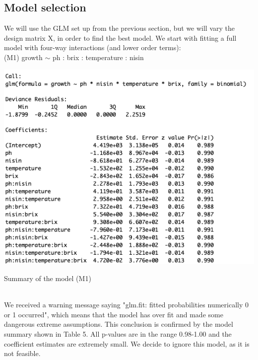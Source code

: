 \documentclass{article}
\begin{document}
\subsection{Model selection}
We will use the GLM set up from the previous section, but we will vary the design matrix X, in order to find the best model.
We start with fitting a full model with four-way interactions (and lower order terms): 
\\(M1)   growth $\sim$ ph : brix : temperature : nisin 
\begin{table}[h!]
\includegraphics[scale = 0.5]{table5.png}
\caption{Summary of the model (M1) }
\end{table}
\\ We received a warning message saying "glm.fit: fitted probabilities numerically 0 or 1 occurred", which means that the model has over fit and made some dangerous extreme assumptions. This conclusion is confirmed by the model summary shown in Table 5. All p-values are in the range 0.98-1.00 and the coefficient estimates are extremely small. We decide to ignore this model, as it is not feasible. \\ 
\end{document}
